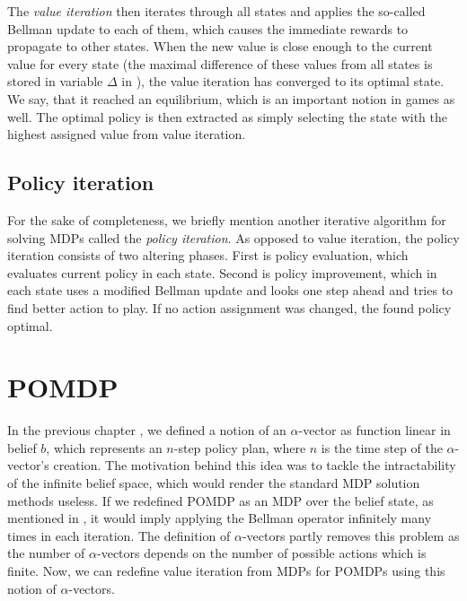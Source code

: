 \documentclass[../main.tex]{subfiles}
\begin{document}
The \textit{value iteration}  then iterates through all states and applies the so-called Bellman update to each of them, which causes the immediate rewards to propagate to other states.
When the new value is close enough to the current value for every state (the maximal difference of these values from all states is stored in variable $\Delta$ in ), the value iteration has converged to its optimal state.
We say, that it reached an equilibrium, which is an important notion in games as well.
The optimal policy is then extracted as simply selecting the state with the highest assigned value from value iteration.

\subsection{Policy iteration}\label{standard:mdp:policyiter}
For the sake of completeness, we briefly mention another iterative algorithm for solving MDPs called the \textit{policy iteration}.
As opposed to value iteration, the policy iteration consists of two altering phases.
First is policy evaluation, which evaluates current policy in each state.
Second is policy improvement, which in each state uses a modified Bellman update and looks one step ahead and tries to find better action to play.
If no action assignment was changed, the found policy optimal.

\section{POMDP}\label{standard:pomdp}
In the previous chapter , we defined a notion of an $\alpha$-vector as function linear in belief $b$, which represents an $n$-step policy plan, where $n$ is the time step of the $\alpha$-vector's creation.
The motivation behind this idea was to tackle the intractability of the infinite belief space, which would render the standard MDP solution methods useless.
If we redefined POMDP as an MDP over the belief state, as mentioned in , it would imply applying the Bellman operator infinitely many times in each iteration.
The definition of $\alpha$-vectors partly removes this problem as the number of $\alpha$-vectors depends on the number of possible actions which is finite.
Now, we can redefine value iteration from MDPs for POMDPs using this notion of $\alpha$-vectors.
\end{document}
